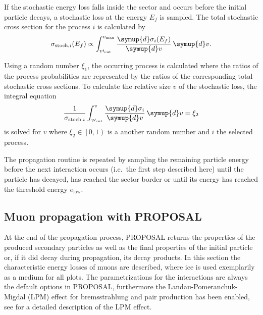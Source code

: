 If the stochastic energy loss falls inside the sector and occurs before the initial particle decays, a stochastic loss at the energy $E_f$ is sampled.
The total stochastic cross section for the process $i$ is calculated by
%
\begin{equation}
	\label{eqn:stoch_crosssection}
	\sigma_{\text{stoch},i}(E_f) \propto \int_{v\prime_\text{cut}}^{v_\text{max}} \frac{\symup{d}\sigma_i(E_f)}{\symup{d}v} \, \symup{d}v.
\end{equation}

Using a random number $\xi_1$, the occurring process is calculated where the ratios of the process probabilities are represented by the ratios of the corresponding total stochastic cross sections.
To calculate the relative size $v$ of the stochastic loss, the integral equation
%
\begin{equation}
	\label{eqn:sample_v}
	\frac{1}{\sigma_{\text{stoch},i}} \int_{v\prime_\text{cut}}^{v} \frac{\symup{d}\sigma_i}{\symup{d}v} \, \symup{d}v = \xi_2
\end{equation}
%
is solved for $v$ where $\xi_2 \in \left[0,1\right)$ is a another random number and $i$ the selected process.

The propagation routine is repeated by sampling the remaining particle energy before the next interaction occurs (i.e.\ the first step described here) until the particle has decayed, has reached the sector border or until its energy has reached the threshold energy $e_\text{low}$.

\subsection{Muon propagation with PROPOSAL}



At the end of the propagation process, PROPOSAL returns the properties of the produced secondary particles as well as the final properties of the initial particle or, if it did decay during propagation, its decay products.
In this section the characteristic energy losses of muons are described, where ice is used exemplarily as a medium for all plots. The parametrizations for the interactions are always the default options in PROPOSAL, furthermore the Landau-Pomeranchuk-Migdal (LPM) effect for bremsstrahlung and pair production has been enabled, see \cite{Kohne:2013zbq} for a detailed description of the LPM effect.

